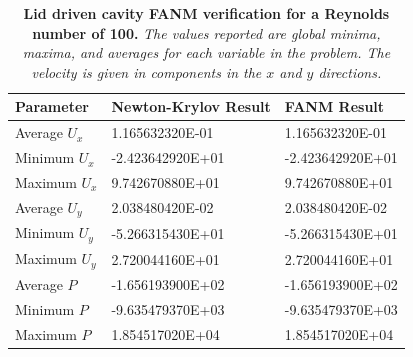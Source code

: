 \begin{table}[h!]
  \begin{center}
    \begin{tabular}{lll}\hline\hline
      \multicolumn{1}{l}{Parameter}& 
      \multicolumn{1}{l}{Newton-Krylov Result}&
      \multicolumn{1}{l}{FANM Result}\\
      \hline
      Average $U_x$ & 1.165632320E-01 & 1.165632320E-01 \\
      Minimum $U_x$ & -2.423642920E+01 & -2.423642920E+01 \\
      Maximum $U_x$ & 9.742670880E+01 & 9.742670880E+01 \\
      \hline
      Average $U_y$ & 2.038480420E-02 & 2.038480420E-02 \\
      Minimum $U_y$ & -5.266315430E+01 & -5.266315430E+01 \\
      Maximum $U_y$ & 2.720044160E+01 & 2.720044160E+01 \\
      \hline
      Average $P$ & -1.656193900E+02 & -1.656193900E+02 \\
      Minimum $P$ & -9.635479370E+03 & -9.635479370E+03 \\
      Maximum $P$ & 1.854517020E+04 & 1.854517020E+04 \\
      \hline\hline
    \end{tabular}
  \end{center}
  \caption{\textbf{Lid driven cavity FANM verification for a Reynolds
      number of 100.} \textit{The values reported are global minima,
      maxima, and averages for each variable in the problem. The
      velocity is given in components in the $x$ and $y$ directions.}}
  \label{tab:driven_re100_results}
\end{table}

